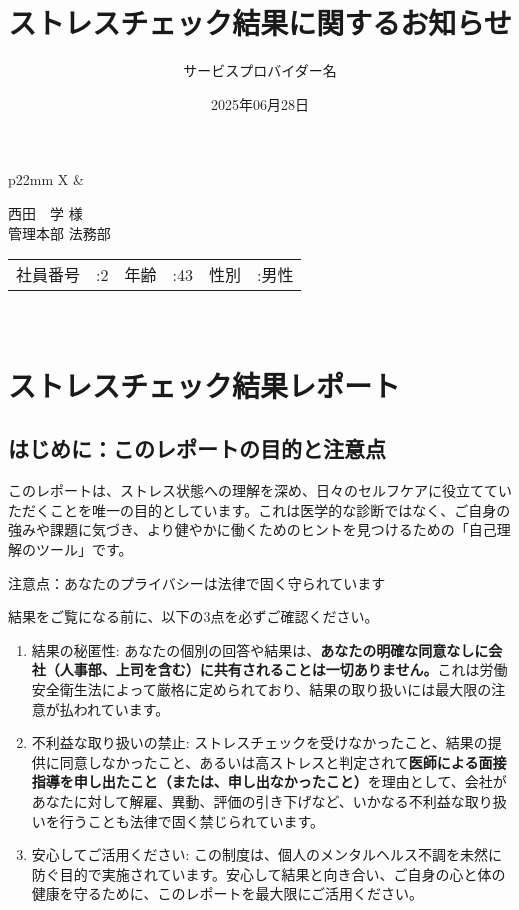 \documentclass[
  xelatex,ja=standard]{bxjsarticle}
\title{ストレスチェック結果に関するお知らせ}
\author{サービスプロバイダー名}
\date{2025年06月28日}
\begin{document}
\maketitle

\pagestyle{empty} \vspace*{34mm}

\begin{tabularx}{\textwidth}{p{22mm} X} & \begin{minipage}[t]{\linewidth} \Large 西田　学 様 \vspace{4mm}\\ \large 管理本部 法務部 \vspace{10mm}\\ \begin{tabular}{lclclc} 社員番号 &:2&年齢 &:43&性別 &:男性 \end{tabular} \end{minipage} \\ \end{tabularx}

\section{ストレスチェック結果レポート}\label{ux30b9ux30c8ux30ecux30b9ux30c1ux30a7ux30c3ux30afux7d50ux679cux30ecux30ddux30fcux30c8}

\subsection{はじめに：このレポートの目的と注意点}\label{ux306fux3058ux3081ux306bux3053ux306eux30ecux30ddux30fcux30c8ux306eux76eeux7684ux3068ux6ce8ux610fux70b9}

このレポートは、ストレス状態への理解を深め、日々のセルフケアに役立てていただくことを唯一の目的としています。これは医学的な診断ではなく、ご自身の強みや課題に気づき、より健やかに働くためのヒントを見つけるための「自己理解のツール」です。

注意点：あなたのプライバシーは法律で固く守られています

結果をご覧になる前に、以下の3点を必ずご確認ください。

\begin{enumerate}
\def\labelenumi{\arabic{enumi}.}
\item
  結果の秘匿性:
  あなたの個別の回答や結果は、\textbf{あなたの明確な同意なしに会社（人事部、上司を含む）に共有されることは一切ありません。}これは労働安全衛生法によって厳格に定められており、結果の取り扱いには最大限の注意が払われています。
\item
  不利益な取り扱いの禁止:
  ストレスチェックを受けなかったこと、結果の提供に同意しなかったこと、あるいは高ストレスと判定されて\textbf{医師による面接指導を申し出たこと（または、申し出なかったこと）}を理由として、会社があなたに対して解雇、異動、評価の引き下げなど、いかなる不利益な取り扱いを行うことも法律で固く禁じられています。
\item
  安心してご活用ください:
  この制度は、個人のメンタルヘルス不調を未然に防ぐ目的で実施されています。安心して結果と向き合い、ご自身の心と体の健康を守るために、このレポートを最大限にご活用ください。
\end{enumerate}
\end{document}
